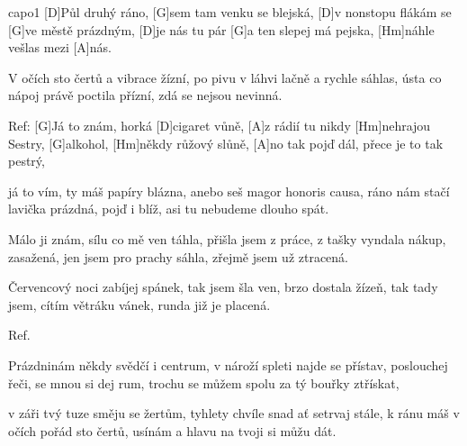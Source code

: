 \hfill capo1
[D]Půl druhý ráno, [G]sem tam venku se blejská,
[D]v nonstopu flákám se [G]ve městě prázdným,
[D]je nás tu pár [G]a ten slepej má pejska,
[Hm]náhle vešlas mezi [A]nás.

V očích sto čertů a vibrace žízní,
po pivu v láhvi lačně a rychle sáhlas,
ústa co nápoj právě poctila přízní,
zdá se nejsou nevinná.

Ref:
[G]Já to znám, horká [D]cigaret vůně,
[A]z rádií tu nikdy [Hm]nehrajou Sestry,
[G]alkohol, [Hm]někdy růžový slůně,
[A]no tak pojď dál, přece je to tak pestrý,

já to vím, ty máš papíry blázna,
anebo seš magor honoris causa,
ráno nám stačí lavička prázdná,
pojď i blíž, asi tu nebudeme dlouho spát.

Málo ji znám, sílu co mě ven táhla,
přišla jsem z práce, z tašky vyndala nákup,
zasažená, jen jsem pro prachy sáhla,
zřejmě jsem už ztracená.

Červencový noci zabíjej spánek,
tak jsem šla ven, brzo dostala žízeň,
tak tady jsem, cítím větráku vánek,
runda již je placená.

Ref.

Prázdninám někdy svědčí i centrum,
v nároží spleti najde se přístav,
poslouchej řeči, se mnou si dej rum,
trochu se můžem spolu za tý bouřky ztřískat,

v záři tvý tuze směju se žertům,
tyhlety chvíle snad ať setrvaj stále,
k ránu máš v očích pořád sto čertů,
usínám a hlavu na tvoji si můžu dát.